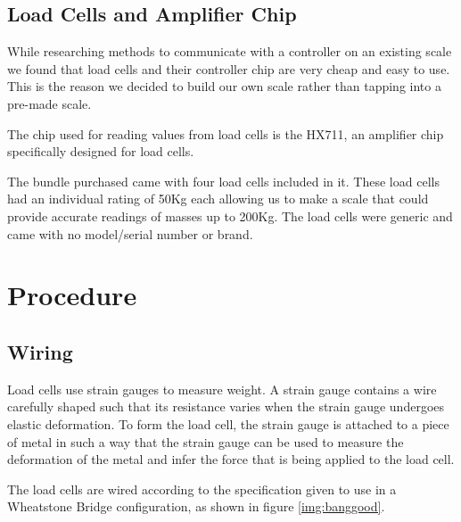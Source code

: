 \documentclass[letterpaper,11pt]{article}
\begin{document}
\subsection{Load Cells and Amplifier Chip}
While researching methods to communicate with a controller on an existing scale
we found that load cells and their controller chip are very cheap and easy to
use. This is the reason we decided to build our own scale rather than tapping
into a pre-made scale.

The chip used for reading values from load cells is the HX711, an amplifier chip
specifically designed for load cells.

The bundle purchased came with four load cells included in it. These load cells
had an individual rating of 50Kg each allowing us to make a scale that could
provide accurate readings of masses up to 200Kg. The load cells were generic and
came with no model/serial number or brand.

\section{Procedure}
\subsection{Wiring}
Load cells use strain gauges to measure weight. A strain gauge contains a wire
carefully shaped such that its resistance varies when the strain gauge undergoes
elastic deformation. To form the load cell, the strain gauge is attached to a
piece of metal in such a way that the strain gauge can be used to measure the
deformation of the metal and infer the force that is being applied to the load
cell.

The load cells are wired according to the specification given to use in a
Wheatstone Bridge configuration, as shown in figure \ref{img:banggood}.
\end{document}
